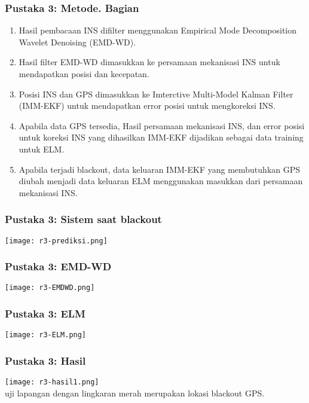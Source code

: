 \begin{frame}[allowframebreaks]
    \frametitle{Pustaka 3: Metode. Bagian}
    \begin{enumerate}
        \justifying
        \item Hasil pembacaan INS difilter menggunakan Empirical Mode Decomposition Wavelet Denoising (EMD-WD).
        \vspace{1em}
        \item Hasil filter EMD-WD dimasukkan ke persamaan mekanisasi INS untuk mendapatkan posisi dan kecepatan.
        \vspace{1em}
        \item Posisi INS dan GPS dimasukkan ke Imterctive Multi-Model Kalman Filter (IMM-EKF) untuk mendapatkan error posisi untuk mengkoreksi INS.
        \vspace{1em}
        \pagebreak
        \item Apabila data GPS tersedia, Hasil persamaan mekanisasi INS, dan error posisi untuk koreksi INS yang dihasilkan IMM-EKF dijadikan sebagai data training untuk ELM.
        \vspace{1em}
        \item Apabila terjadi blackout, data keluaran IMM-EKF yang membutuhkan GPS diubah menjadi data keluaran ELM menggunakan masukkan dari persamaan mekanisasi INS.
    \end{enumerate}
\end{frame}


\begin{frame}
    \frametitle{Pustaka 3: Sistem saat blackout}
    \centering
    \texttt{[image: r3-prediksi.png]}
\end{frame}


\begin{frame}
    \frametitle{Pustaka 3: EMD-WD}
    \centering
    \texttt{[image: r3-EMDWD.png]}
\end{frame}


\begin{frame}
    \frametitle{Pustaka 3: ELM}
    \centering
    \texttt{[image: r3-ELM.png]}
\end{frame}


\begin{frame}
    \frametitle{Pustaka 3: Hasil}
    \centering
    \texttt{[image: r3-hasil1.png]}\\
    uji lapangan dengan lingkaran merah merupakan lokasi blackout GPS.
\end{frame}


